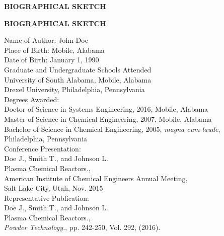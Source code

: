 \vspace*{\fill}
  \begin{center}
  \textbf{BIOGRAPHICAL SKETCH}
\end{center}
\vspace*{\fill}

\newpage
\singlespacing
{}
\setcounter{page}{18}
\vspace*{0.5625 in}
\begin{center}
 \textbf{BIOGRAPHICAL SKETCH}
\end{center}
\vspace{0.25 in}
Name of Author: John Doe \\
Place of Birth: Mobile, Alabama \\
Date of Birth: January 1, 1990 \\
\vspace{5 mm}
Graduate and Undergraduate Schools Attended\\
\hspace{2 em} University of South Alabama, Mobile, Alabama \\
\hspace{2 em} Drexel University, Philadelphia, Pennsylvania \\
\vspace{5 mm}
Degrees Awarded: \\
\hspace{2 em} Doctor of Science in Systems Engineering, 2016, Mobile, Alabama \\
\hspace{2 em} Master of Science in Chemical Engineering, 2007, Mobile, Alabama \\
\hspace{2 em} Bachelor of Science in Chemical Engineering, 2005, \emph{magna cum laude},\\
\hspace{2 em} Philadelphia, Pennsylvania\\ 
\vspace{5 mm}
Conference Presentation: \\
\hspace{2 em} Doe J., Smith T., and Johnson L. \\
\hspace{2 em} Plasma Chemical Reactors.,\\
\hspace{2 em} American Institute of Chemical Engineers Annual Meeting,\\ 
\hspace{2 em} Salt Lake City, Utah, Nov. 2015\\
\vspace{5 mm}
Representative Publication: \\
\hspace{2 em}  Doe J., Smith T., and Johnson L. \\
\hspace{2 em} Plasma Chemical Reactors.,\\
\hspace{2 em} \emph{Powder Technology.}, pp. 242-250, Vol. 292, (2016).\\
\vspace{5 mm}
